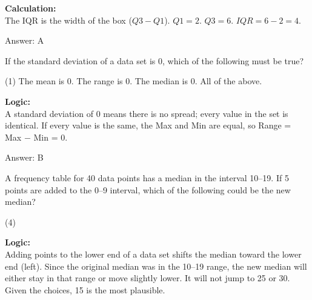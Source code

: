 \documentclass[11pt,paper=a4,answers]{exam}
\begin{document}
\begin{questions}
\begin{solution}
\textbf{Calculation:} \\
The IQR is the width of the box ($Q3 - Q1$). 
$Q1 = 2$. 
$Q3 = 6$. 
$IQR = 6 - 2 = 4$.

\vspace{30pt}

Answer: \colorbox{yellow!100}{A}
\end{solution}

\vspace{60pt}

\question
If the standard deviation of a data set is 0, which of the following must be true?
\begin{tasks}(1)
    \task The mean is 0.
    \task The range is 0.
    \task The median is 0.
    \task All of the above.
\end{tasks}

\begin{solution}
\textbf{Logic:} \\
A standard deviation of 0 means there is no spread; every value in the set is identical. If every value is the same, the Max and Min are equal, so Range = Max $-$ Min = 0.

\vspace{30pt}

Answer: \colorbox{yellow!100}{B}
\end{solution}

\vspace{60pt}

\question
A frequency table for 40 data points has a median in the interval 10--19. If 5 points are added to the 0--9 interval, which of the following could be the new median?
\begin{tasks}(4)
\end{tasks}

\begin{solution}
\textbf{Logic:} \\
Adding points to the lower end of a data set shifts the median toward the lower end (left). Since the original median was in the 10--19 range, the new median will either stay in that range or move slightly lower. It will not jump to 25 or 30. Given the choices, 15 is the most plausible.

\vspace{30pt}


\end{solution}
\end{questions}
\end{document}
